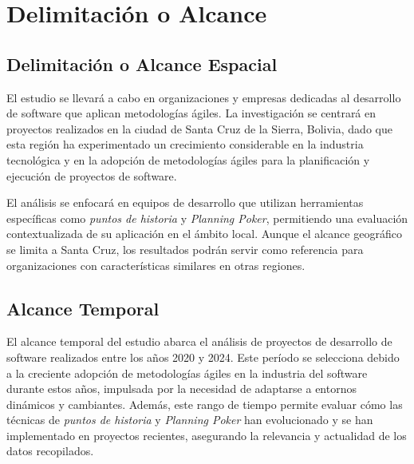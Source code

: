 \chapter{Delimitación o Alcance}

\section{Delimitación o Alcance Espacial}

El estudio se llevará a cabo en organizaciones y empresas dedicadas al desarrollo de software que aplican metodologías ágiles. La investigación se centrará en proyectos realizados en la ciudad de Santa Cruz de la Sierra, Bolivia, dado que esta región ha experimentado un crecimiento considerable en la industria tecnológica y en la adopción de metodologías ágiles para la planificación y ejecución de proyectos de software. 

El análisis se enfocará en equipos de desarrollo que utilizan herramientas específicas como \textit{puntos de historia} y \textit{Planning Poker}, permitiendo una evaluación contextualizada de su aplicación en el ámbito local. Aunque el alcance geográfico se limita a Santa Cruz, los resultados podrán servir como referencia para organizaciones con características similares en otras regiones.

\section{Alcance Temporal}

El alcance temporal del estudio abarca el análisis de proyectos de desarrollo de software realizados entre los años 2020 y 2024. Este período se selecciona debido a la creciente adopción de metodologías ágiles en la industria del software durante estos años, impulsada por la necesidad de adaptarse a entornos dinámicos y cambiantes. Además, este rango de tiempo permite evaluar cómo las técnicas de \textit{puntos de historia} y \textit{Planning Poker} han evolucionado y se han implementado en proyectos recientes, asegurando la relevancia y actualidad de los datos recopilados.
